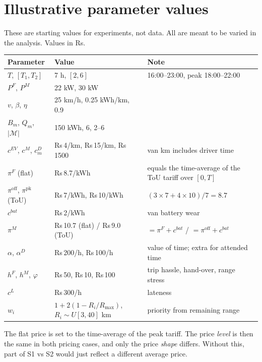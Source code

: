 \documentclass[11pt,a4paper]{article}
\newcommand{\M}{\mathcal{M}}
\newcommand{\pk}{\mathrm{pk}}
\newcommand{\off}{\mathrm{off}}
\begin{document}
\appendix
\section{Illustrative parameter values}\label{app:values}

These are starting values for experiments, not data. All are meant to be varied in the analysis. Values in Rs.

\begin{center}
\renewcommand{\arraystretch}{1.15}
\begin{tabular}{@{}llp{6.2cm}@{}}
\toprule
\textbf{Parameter} & \textbf{Value} & \textbf{Note} \\
\midrule
$T$, $[T_1,T_2]$ & 7 h, $[2,6]$ & 16:00--23:00, peak 18:00--22:00 \\
$P^F$, $P^M$ & 22 kW, 30 kW & \\
$v$, $\beta$, $\eta$ & 25 km/h, 0.25 kWh/km, 0.9 & \\
$B_m$, $Q_m$, $|\M|$ & 150 kWh, 6, 2--6 & \\
$c^{EV}$, $c^M$, $c^D_m$ & Rs\,4/km, Rs\,15/km, Rs\,1500 & van km includes driver time \\
$\pi^F$ (flat) & Rs\,8.7/kWh & equals the time-average of the ToU tariff over $[0,T]$ \\
$\pi^\off$, $\pi^\pk$ (ToU) & Rs\,7/kWh, Rs\,10/kWh & $(3\times7+4\times10)/7=8.7$ \\
$c^{bat}$ & Rs\,2/kWh & van battery wear \\
$\pi^M$ & Rs\,10.7 (flat) / Rs\,9.0 (ToU) & $=\pi^F+c^{bat}$ / $=\pi^\off+c^{bat}$ \\
$\alpha$, $\alpha^D$ & Rs\,200/h, Rs\,100/h & value of time; extra for attended time \\
$h^F$, $h^M$, $\varphi$ & Rs\,50, Rs\,10, Rs\,100 & trip hassle, hand-over, range stress \\
$c^L$ & Rs\,300/h & lateness \\
$w_i$ & $1+2(1-R_i/R_{\max})$, $R_i\sim U[3,40]$ km & priority from remaining range \\
\bottomrule
\end{tabular}
\end{center}

The flat price is set to the time-average of the peak tariff. The price \emph{level} is then the same in both pricing cases, and only the price \emph{shape} differs. Without this, part of S1 vs S2 would just reflect a different average price.
\end{document}
